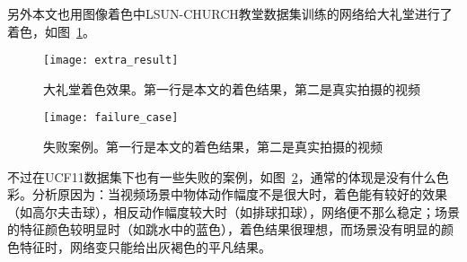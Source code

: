   另外本文也用图像着色中LSUN-CHURCH教堂数据集训练的网络给大礼堂进行了着色，如图~\ref{fig:extra_result}。

  \begin{figure}[H]
    \centering
    \texttt{[image: extra\_result]}
    \caption[大礼堂着色效果]{大礼堂着色效果。第一行是本文的着色结果，第二是真实拍摄的视频}
    \label{fig:extra_result}
  \end{figure}

  \begin{figure}[H]
    \centering
    \texttt{[image: failure\_case]}
    \caption[失败案例]{失败案例。第一行是本文的着色结果，第二是真实拍摄的视频}
    \label{fig:failure_case}
  \end{figure}  

  不过在UCF11数据集下也有一些失败的案例，如图~\ref{fig:failure_case}，通常的体现是没有什么色彩。分析原因为：当视频场景中物体动作幅度不是很大时，着色能有较好的效果（如高尔夫击球），相反动作幅度较大时（如排球扣球），网络便不那么稳定；场景的特征颜色较明显时（如跳水中的蓝色），着色结果很理想，而场景没有明显的颜色特征时，网络变只能给出灰褐色的平凡结果。





  